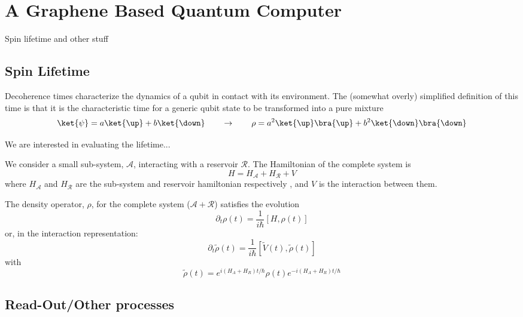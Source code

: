 \chapter{A Graphene Based Quantum Computer}
Spin lifetime and other stuff

\section{Spin Lifetime}

Decoherence times characterize the dynamics of a qubit in contact with its environment. The (somewhat overly) simplified definition of this time is that it is the characteristic time for a generic qubit state
to be transformed into a pure mixture
\begin{equation}
  \ket{\psi}=a\ket{\up}+b\ket{\down} \qquad\rightarrow\qquad
  \rho = a^2\ket{\up}\bra{\up} + b^2\ket{\down}\bra{\down}
\end{equation}


We are interested in evaluating the lifetime...

We consider a small sub-system, $\mathcal{A}$, interacting with a reservoir $\mathcal{R}$. The Hamiltonian of the complete system is
\begin{equation}
  H = H_{\mathcal{A}} + H_{\mathcal{R}} + V
\end{equation}
where $H_{\mathcal{A}}$ and $H_{\mathcal{R}}$ are the sub-system and reservoir hamiltonian respectively , and $V$ is the interaction between them.

The density operator, $\rho$, for the complete system ($\mathcal{A} + \mathcal{R}$) satisfies the evolution
\begin{equation}
  \partial_t \rho(t) = \frac{1}{i\hbar}\left[H,\rho(t)\right]
\end{equation}
or, in the interaction representation:
\begin{equation}
  \partial_t \tilde{\rho}(t) =
  \frac{1}{i\hbar}\left[\tilde{V}(t),\tilde{\rho}(t)\right]
\end{equation}
with
\begin{equation}
  \tilde{\rho}(t) = e^{i(H_A+H_R)t/\hbar} \rho(t) e^{-i(H_A+H_R)t/\hbar}
\end{equation}



\section{Read-Out/Other processes}
